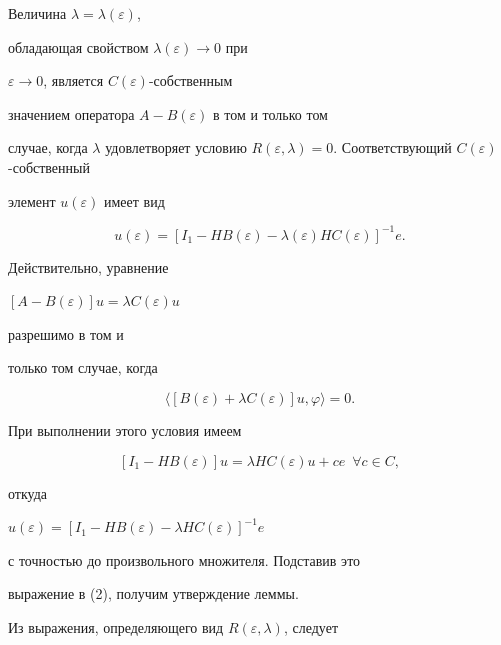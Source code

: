 \begin{lemnonum}


Величина $\lambda= \lambda(\varepsilon)$,


обладающая свойством $\lambda(\varepsilon)\to 0$ при


$\varepsilon\to 0$, является $C(\varepsilon)$-собственным


значением оператора $A-B(\varepsilon)$ в том и только том


случае, когда $\lambda$ удовлетворяет условию $R(\varepsilon,


\lambda)=0$. Соответствующий $C(\varepsilon)$-собственный


элемент $u(\varepsilon)$ имеет вид


$$


u(\varepsilon)=[I_1-HB(\varepsilon)-\lambda(\varepsilon)HC(\varepsilon)]^


{-1}e.


$$


\end{lemnonum}





Действительно, уравнение 


$[A -B(\varepsilon)]u=\lambda C(\varepsilon)u$


разрешимо в том и


только том случае, когда


\begin{equation}


\langle [B(\varepsilon)+\lambda


C(\varepsilon)]u,\varphi \rangle = 0.


\end{equation}


При выполнении этого условия имеем


$$


[I_1 - HB(\varepsilon)]u=\lambda


HC(\varepsilon)u+ce \ \; \forall c \in C,


$$


откуда


$u(\varepsilon)=[I_1-HB(\varepsilon)-\lambda HC(\varepsilon)]^{-1}e$


с точностью до произвольного множителя. Подставив это


выражение в (2), получим утверждение леммы.





Из выражения, определяющего вид $R(\varepsilon, \lambda)$, следует


